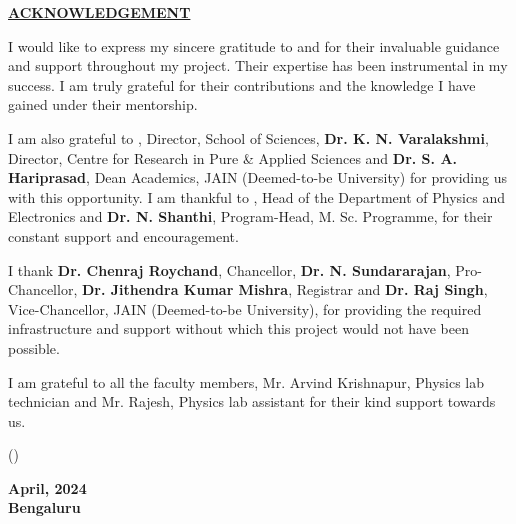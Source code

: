 \thispagestyle{empty}

\begin{center}

    \Large{\underline{\textbf{ACKNOWLEDGEMENT}}}\\

\end{center}

\vspace{1cm}

\noindent
I would like to express my sincere gratitude to \textbf{\gnameOne} and \textbf{\gnameTwo} for their
invaluable guidance and support throughout my project.
Their expertise has been instrumental in my success. I am truly grateful for their contributions
and the knowledge I have gained under their mentorship.

\vspace{0.5cm}

\noindent
I am also grateful to \textbf{\director}, Director, School of Sciences,
\textbf{Dr. K. N. Varalakshmi}, Director, Centre for Research in Pure \& Applied Sciences and
\textbf{Dr. S. A. Hariprasad}, Dean Academics, JAIN (Deemed-to-be
University) for providing us with this opportunity. I am thankful to
\textbf{\hod}, Head of the Department of Physics and Electronics and
\textbf{Dr. N. Shanthi}, Program-Head, M. Sc. Programme, for their constant
support and encouragement.

\vspace{0.5cm}

\noindent
I thank \textbf{Dr. Chenraj Roychand}, Chancellor, \textbf{Dr. N. Sundararajan},
Pro-Chancellor, \textbf{Dr. Jithendra Kumar Mishra}, Registrar and \textbf{Dr. Raj Singh}, Vice-Chancellor, JAIN (Deemed-to-be University), for
providing the required infrastructure and support without which this project would not have
been possible.

\vspace{0.5cm}

\noindent
I am grateful to all the faculty members, Mr. Arvind Krishnapur, Physics lab technician and Mr. Rajesh, Physics lab assistant for their kind support towards us.

\vspace{1.5cm}

\noindent
\begin{minipage}{0.5\textwidth}

    (\auth)

\end{minipage}%
\begin{minipage}{0.5\textwidth}
    \flushright

    \textbf{April, 2024\\
        Bengaluru}
\end{minipage}

